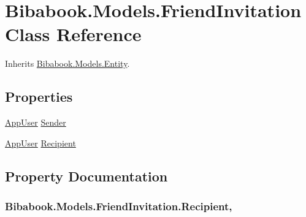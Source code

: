 \hypertarget{class_bibabook_1_1_models_1_1_friend_invitation}{}\section{Bibabook.\+Models.\+Friend\+Invitation Class Reference}
\label{class_bibabook_1_1_models_1_1_friend_invitation}


Inherits \hyperlink{class_bibabook_1_1_models_1_1_entity}{Bibabook.\+Models.\+Entity}.

\subsection*{Properties}
\begin{DoxyCompactItemize}
\item 
\hyperlink{class_bibabook_1_1_models_1_1_app_user}{App\+User} \hyperlink{class_bibabook_1_1_models_1_1_friend_invitation_acbafc27ba0a33d21f303eacd3f6364dd}{Sender}
\item 
\hyperlink{class_bibabook_1_1_models_1_1_app_user}{App\+User} \hyperlink{class_bibabook_1_1_models_1_1_friend_invitation_a15c1892e1ddcec76af7e25e9a6e23222}{Recipient}
\end{DoxyCompactItemize}


\subsection{Property Documentation}
\hypertarget{class_bibabook_1_1_models_1_1_friend_invitation_a15c1892e1ddcec76af7e25e9a6e23222}{}
\subsubsection[{Recipient}]{ Bibabook.\+Models.\+Friend\+Invitation.\+Recipient\hspace{0.3cm}{\ttfamily [get]}, {\ttfamily [set]}}\label{class_bibabook_1_1_models_1_1_friend_invitation_a15c1892e1ddcec76af7e25e9a6e23222}
\hypertarget{class_bibabook_1_1_models_1_1_friend_invitation_acbafc27ba0a33d21f303eacd3f6364dd}{}
